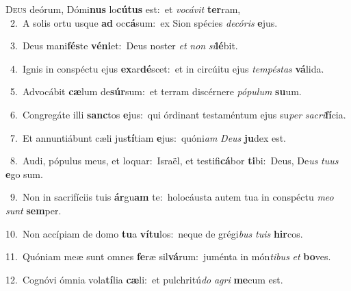 \lettrine{\initial\textcolor{\initialcolor}{D}}{eus} deórum, Dómi\textbf{nus} lo\-\textbf{cú}\-\textbf{tus} est:~\star et \textit{vo}\-\textit{cá}\textit{vit} \textbf{ter}\-ram,\\
{\numbfont\textcolor{\numbcolor}{~2.}}~A solis ortu usque \textbf{ad} oc\-\textbf{cá}\-sum:~\star ex Sion spécies \textit{de}\-\textit{có}\textit{ris} \textbf{e}\-jus.\par
{\numbfont\textcolor{\numbcolor}{~3.}}~Deus mani\-\textbf{fés}\-te \textbf{vé}\-\textbf{ni}et:~\star Deus noster \textit{et} \textit{non} \textit{si}\-\textbf{lé}bit.\par
{\numbfont\textcolor{\numbcolor}{~4.}}~Ignis in conspéctu ejus \textbf{ex}\-ar\-\textbf{dé}\-scet:~\star et in circúitu ejus \textit{tem}\-\textit{pés}\textit{tas} \textbf{vá}\-lida.\par
{\numbfont\textcolor{\numbcolor}{~5.}}~Advocábit \textbf{cæ}\-lum de\-\textbf{súr}\-sum:~\star et terram discérnere \textit{pó}\-\textit{pu}\textit{lum} \textbf{su}\-um.\par
{\numbfont\textcolor{\numbcolor}{~6.}}~Congregáte illi \textbf{sanc}\-tos \textbf{e}\-jus:~\star qui órdinant testaméntum ejus su\textit{per} \textit{sa}\-\textit{cri}\textbf{fí}cia.\par
{\numbfont\textcolor{\numbcolor}{~7.}}~Et annuntiábunt cæli jus\-\textbf{tí}\-tiam \textbf{e}\-jus:~\star quóni\textit{am} \textit{De}\-\textit{us} \textbf{ju}\-dex est.\par
{\numbfont\textcolor{\numbcolor}{~8.}}~Audi, pópulus meus, et loquar:~\dagger Israël, et testifi\-\textbf{cá}\-bor \textbf{ti}\-bi:~\star Deus, De\textit{us} \textit{tu}\-\textit{us} \textbf{e}\-go sum.\par
{\numbfont\textcolor{\numbcolor}{~9.}}~Non in sacrifíciis tuis \textbf{ár}\-gu\textbf{am} te:~\star holocáusta autem tua in conspéctu \textit{me}\-\textit{o} \textit{sunt} \textbf{sem}\-per.\par
{\numbfont\textcolor{\numbcolor}{10.}}~Non accípiam de domo \textbf{tu}\-a \textbf{ví}\-\textbf{tu}los:~\star neque de grégi\textit{bus} \textit{tu}\-\textit{is} \textbf{hir}\-cos.\par
{\numbfont\textcolor{\numbcolor}{11.}}~Quóniam meæ sunt omnes \textbf{fe}\-ræ sil\-\textbf{vá}\-rum:~\star juménta in món\-\textit{ti}\-\textit{bus} \textit{et} \textbf{bo}\-ves.\par
{\numbfont\textcolor{\numbcolor}{12.}}~Cognóvi ómnia vola\-\textbf{tí}\-lia \textbf{cæ}\-li:~\star et pulchritú\textit{do} \textit{a}\-\textit{gri} \textbf{me}\-cum est.\par
